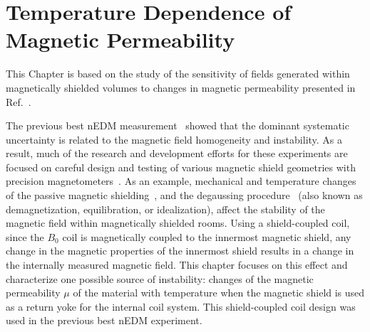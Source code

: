 \chapter{Temperature Dependence of Magnetic Permeability\label{chap:muofT}}
This Chapter is based on the study of the sensitivity of fields
generated within magnetically shielded volumes to changes in magnetic
permeability presented in Ref.~\cite{Andalib:2016ahj}.

The previous best nEDM measurement~\cite{Baker2006, Pendlebury2015} showed that
the dominant systematic uncertainty is related to the magnetic field
homogeneity and instability. As a result, much of the research and
development efforts for these experiments are focused on careful
design and testing of various magnetic shield geometries with
precision magnetometers~\cite{altarev2014magnetically,
  brys2005magnetic,afach2014dynamic,patton2014all}. As an example,
mechanical and temperature changes of the passive magnetic
shielding~\cite{voigt2013,thiel2007demagnetization}, and the
degaussing
procedure~\cite{thiel2007demagnetization,altarev2015minimizing,sun2016dynamic}
(also known as demagnetization, equilibration, or idealization),
affect the stability of the magnetic field within magnetically
shielded rooms. Using a shield-coupled coil, since the $B_0$ coil is
magnetically coupled to the innermost magnetic shield, any change in
the magnetic properties of the innermost shield results in a change in
the internally measured magnetic field. This chapter focuses on this
effect and characterize one possible source of instability: changes of
the magnetic permeability $\mu$ of the material with temperature when
the magnetic shield is used as a return yoke for the internal coil
system. This shield-coupled coil design was used in the previous best
nEDM experiment.




